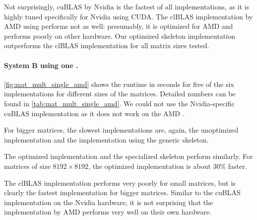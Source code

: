 Not surprisingly, cuBLAS by Nvidia is the fastest of all implementations, as it is highly tuned specifically for Nvidia \GPUs using CUDA.
The clBLAS implementation by AMD using \OpenCL performs not as well:
presumably, it is optimized for AMD \GPUs and performs poorly on other hardware.
Our optimized \allpairs skeleton implementation outperforms the clBLAS implementation for all matrix sizes tested.

\paragraph{System B using one \GPU.}
\autoref{fig:mat_mult_single_amd} shows the runtime in seconds for five of the six implementations for different sizes of the matrices.
Detailed numbers can be found in \autoref{tab:mat_mult_single_amd}.
We could not use the Nvidia-specific cuBLAS implementation as it does not work on the AMD \GPU.

For bigger matrices, the slowest implementations are, again, the unoptimized \OpenCL implementation and the implementation using the generic \allpairs skeleton.

The optimized \OpenCL implementation and the specialized \allpairs skeleton perform similarly.
For matrices of size $8192\times 8192$, the optimized \OpenCL implementation is about 30\% faster.

The clBLAS implementation performs very poorly for small matrices, but is clearly the fastest implementation for bigger matrices.
Similar to the cuBLAS implementation on the Nvidia hardware, it is not surprising that the implementation by AMD performs very well on their own hardware.


